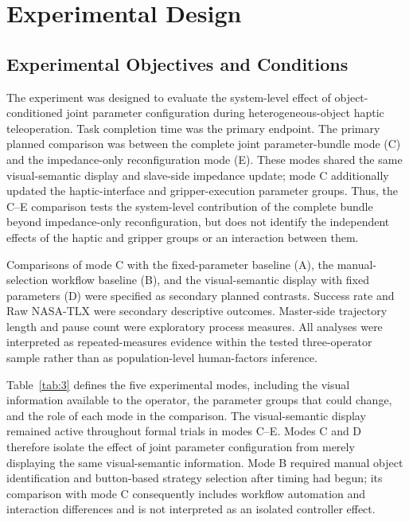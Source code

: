 \section{Experimental Design}
\subsection{Experimental Objectives and Conditions}
The experiment was designed to evaluate the system-level effect of object-conditioned joint parameter configuration during heterogeneous-object haptic teleoperation. Task completion time was the primary endpoint. The primary planned comparison was between the complete joint parameter-bundle mode (C) and the impedance-only reconfiguration mode (E). These modes shared the same visual-semantic display and slave-side impedance update; mode C additionally updated the haptic-interface and gripper-execution parameter groups. Thus, the C--E comparison tests the system-level contribution of the complete bundle beyond impedance-only reconfiguration, but does not identify the independent effects of the haptic and gripper groups or an interaction between them.

Comparisons of mode C with the fixed-parameter baseline (A), the manual-selection workflow baseline (B), and the visual-semantic display with fixed parameters (D) were specified as secondary planned contrasts. Success rate and Raw NASA-TLX were secondary descriptive outcomes. Master-side trajectory length and pause count were exploratory process measures. All analyses were interpreted as repeated-measures evidence within the tested three-operator sample rather than as population-level human-factors inference.

Table~\ref{tab:3} defines the five experimental modes, including the visual information available to the operator, the parameter groups that could change, and the role of each mode in the comparison. The visual-semantic display remained active throughout formal trials in modes C--E. Modes C and D therefore isolate the effect of joint parameter configuration from merely displaying the same visual-semantic information. Mode B required manual object identification and button-based strategy selection after timing had begun; its comparison with mode C consequently includes workflow automation and interaction differences and is not interpreted as an isolated controller effect.

